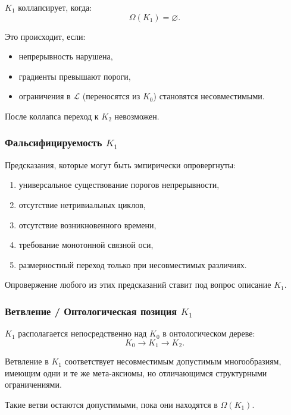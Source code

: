 $K_1$ коллапсирует, когда:
\[
\Omega(K_1) = \varnothing.
\]

Это происходит, если:
\begin{itemize}
    \item непрерывность нарушена,
    \item градиенты превышают пороги,
    \item ограничения в $\mathcal{L}$ (переносятся из $K_0$) становятся
          несовместимыми.
\end{itemize}

После коллапса переход к $K_2$ невозможен.

\subsubsection{Фальсифицируемость \texorpdfstring{$K_1$}{K_1}}

Предсказания, которые могут быть эмпирически опровергнуты:
\begin{enumerate}
    \item универсальное существование порогов непрерывности,
    \item отсутствие нетривиальных циклов,
    \item отсутствие возникновенного времени,
    \item требование монотонной связной оси,
    \item размерностный переход только при несовместимых различиях.
\end{enumerate}

Опровержение любого из этих предсказаний ставит под вопрос описание $K_1$.

\subsubsection{Ветвление / Онтологическая позиция \texorpdfstring{$K_1$}{K_1}}

$K_1$ располагается непосредственно над $K_0$ в онтологическом дереве:
\[
K_0 \to K_1 \to K_2.
\]

Ветвление в $K_1$ соответствует несовместимым допустимым многообразиям,
имеющим одни и те же мета-аксиомы, но отличающимся структурными
ограничениями.

Такие ветви остаются допустимыми, пока они находятся в $\Omega(K_1)$.

